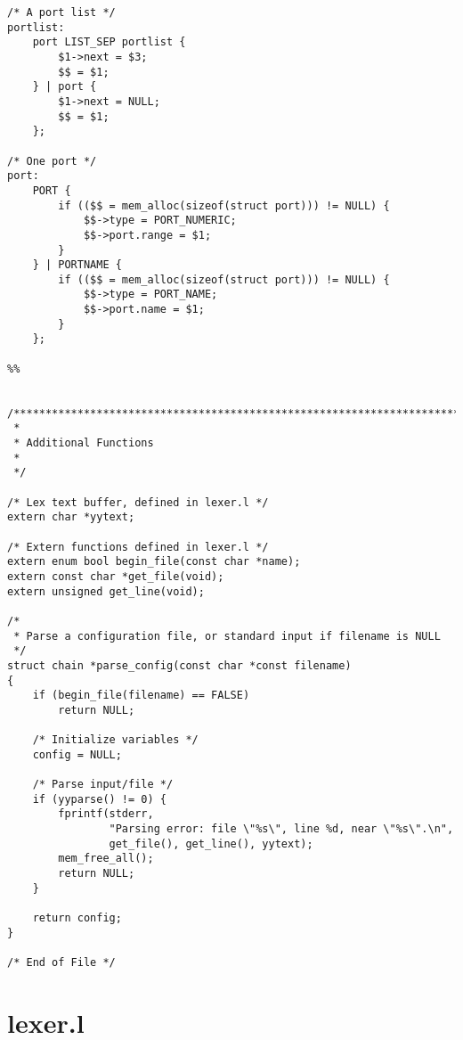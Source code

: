 \documentclass[a4paper,landscape,twocolumn,11pt]{article}
\begin{document}
{\begin{verbatim}
/* A port list */
portlist:
    port LIST_SEP portlist {
        $1->next = $3;
        $$ = $1;
    } | port {
        $1->next = NULL;
        $$ = $1;
    };

/* One port */
port:
    PORT {
        if (($$ = mem_alloc(sizeof(struct port))) != NULL) {
            $$->type = PORT_NUMERIC;
            $$->port.range = $1;
        }
    } | PORTNAME {
        if (($$ = mem_alloc(sizeof(struct port))) != NULL) {
            $$->type = PORT_NAME;
            $$->port.name = $1;
        }
    };

%%


/*****************************************************************************
 *
 * Additional Functions
 *
 */

/* Lex text buffer, defined in lexer.l */
extern char *yytext;

/* Extern functions defined in lexer.l */
extern enum bool begin_file(const char *name);
extern const char *get_file(void);
extern unsigned get_line(void);

/*
 * Parse a configuration file, or standard input if filename is NULL
 */
struct chain *parse_config(const char *const filename)
{
    if (begin_file(filename) == FALSE)
        return NULL;

    /* Initialize variables */
    config = NULL;

    /* Parse input/file */
    if (yyparse() != 0) {
        fprintf(stderr,
                "Parsing error: file \"%s\", line %d, near \"%s\".\n",
                get_file(), get_line(), yytext);
        mem_free_all();
        return NULL;
    }

    return config;
}

/* End of File */
\end{verbatim}}

\section*{lexer.l}
\end{document}
